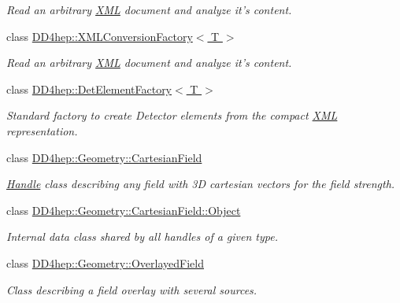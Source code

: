 \begin{DoxyCompactItemize}
\begin{DoxyCompactList}\small\item\em Read an arbitrary \hyperlink{namespace_d_d4hep_1_1_x_m_l}{XML} document and analyze it's content. \item\end{DoxyCompactList}\item 
class \hyperlink{class_d_d4hep_1_1_x_m_l_conversion_factory}{DD4hep::XMLConversionFactory$<$ T $>$}
\begin{DoxyCompactList}\small\item\em Read an arbitrary \hyperlink{namespace_d_d4hep_1_1_x_m_l}{XML} document and analyze it's content. \item\end{DoxyCompactList}\item 
class \hyperlink{class_d_d4hep_1_1_det_element_factory}{DD4hep::DetElementFactory$<$ T $>$}
\begin{DoxyCompactList}\small\item\em Standard factory to create Detector elements from the compact \hyperlink{namespace_d_d4hep_1_1_x_m_l}{XML} representation. \item\end{DoxyCompactList}\item 
class \hyperlink{class_d_d4hep_1_1_geometry_1_1_cartesian_field}{DD4hep::Geometry::CartesianField}
\begin{DoxyCompactList}\small\item\em \hyperlink{class_d_d4hep_1_1_handle}{Handle} class describing any field with 3D cartesian vectors for the field strength. \item\end{DoxyCompactList}\item 
class \hyperlink{class_d_d4hep_1_1_geometry_1_1_cartesian_field_1_1_object}{DD4hep::Geometry::CartesianField::Object}
\begin{DoxyCompactList}\small\item\em Internal data class shared by all handles of a given type. \item\end{DoxyCompactList}\item 
class \hyperlink{class_d_d4hep_1_1_geometry_1_1_overlayed_field}{DD4hep::Geometry::OverlayedField}
\begin{DoxyCompactList}\small\item\em Class describing a field overlay with several sources. \item\end{DoxyCompactList}\item 

\end{DoxyCompactItemize}
